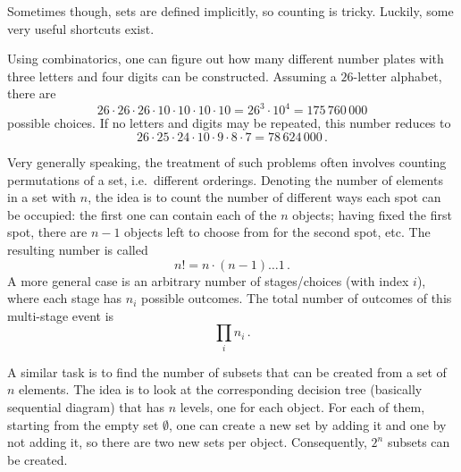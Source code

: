Sometimes though, sets are defined implicitly, so counting is tricky. Luckily, some very useful shortcuts exist.

\begin{ex}
Using combinatorics, one can figure out how many different number plates with three letters and four digits can be constructed. Assuming a $26$-letter alphabet, there are
\begin{equation*}
26 \cdot 26 \cdot 26 \cdot 10 \cdot 10 \cdot 10 \cdot 10 = 26^3 \cdot 10^4 = 175 \, 760 \, 000
\end{equation*}
possible choices. If no letters and digits may be repeated, this number reduces to
\begin{equation}
26 \cdot 25 \cdot 24 \cdot 10 \cdot 9 \cdot 8 \cdot 7 = 78 \, 624 \, 000 \, .
\end{equation}
\end{ex}

Very generally speaking, the treatment of such problems often involves counting permutations of a set, i.e.~different orderings. Denoting the number of elements in a set with $n$, the idea is to count the number of different ways each spot can be occupied: the first one can contain each of the $n$ objects; having fixed the first spot, there are $n - 1$ objects left to choose from for the second spot, etc. The resulting number is called 
\begin{equation}
n! = n \cdot (n - 1) \dots 1 \, .
\end{equation}
A more general case is an arbitrary number of stages/choices (with index $i$), where each stage has $n_i$ possible outcomes. The total number of outcomes of this multi-stage event is
\begin{equation}
\prod_i n_i \, .
\end{equation}

A similar task is to find the number of subsets that can be created from a set of $n$ elements. The idea is to look at the corresponding decision tree (basically sequential diagram) that has $n$ levels, one for each object. For each of them, starting from the empty set $\emptyset$, one can create a new set by adding it and one by not adding it, so there are two new sets per object. Consequently, $2^n$ subsets can be created.



